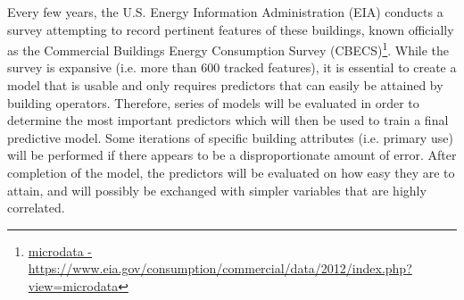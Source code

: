 Every few years, the U.S. Energy Information Administration (EIA) conducts a survey attempting to record pertinent features of these buildings, known officially as the Commercial Buildings Energy Consumption Survey (CBECS)\footnote{\href{https://www.eia.gov/consumption/commercial/data/2012/index.php?view=microdata}{microdata - \url{https://www.eia.gov/consumption/commercial/data/2012/index.php?view=microdata}}}.  While the survey is expansive (i.e. more than 600 tracked features), it is essential to create a model that is usable and only requires predictors that can easily be attained by building operators.  Therefore, series of models will be evaluated in order to determine the most important predictors which will then be used to train a final predictive model.  Some iterations of specific building attributes (i.e. primary use) will be performed if there appears to be a disproportionate amount of error.  After completion of the model, the predictors will be evaluated on how easy they are to attain, and will possibly be exchanged with simpler variables that are highly correlated.